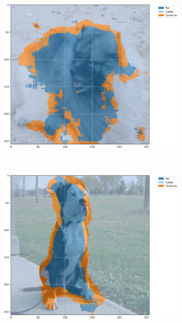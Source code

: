 \begin{figure}[H]
    \centering
    \caption[Segmentação com U-Net-\textit{Like}, BPCAPooling, 500 épocas, \textit{Oxford-IIIT Pets}, acurácia.]{Exemplos segmentados a partir de U-Net-\textit{Like} com BPCAPooling e 500 épocas no conjunto de dados \textit{Oxford-IIIT Pets} baseada em acurácia.}
    \label{results:fig:semantic:12}
     \begin{subfigure}[t]{0.32\textwidth}
         \centering
         \includegraphics[width=1\linewidth]{recursos/imagens/results/bpca_acc_unetlike500_image_0_overlayed_segmentation.png}
         \label{results:fig:semantic:12.1}
     \end{subfigure}%
     ~ 
     \begin{subfigure}[t]{0.32\textwidth}
         \centering
         \includegraphics[width=1\linewidth]{recursos/imagens/results/bpca_acc_unetlike500_image_1_overlayed_segmentation.png}

\end{subfigure}
\end{figure}
